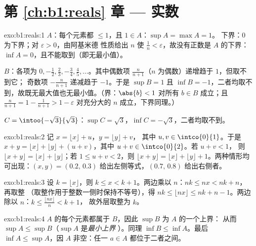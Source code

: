 \section*{第 \ref{ch:b1:reals} 章 --- 实数}

\begin{solution}{exo:b1:reals:1}
$A$：每个元素都 $\leq 1$，且 $1 \in A$：$\sup A = \max A = 1$。
下界：$0$ 为下界；对 $\varepsilon > 0$，由阿基米德
性质给出 $n$ 使 $\frac 1n < \varepsilon$，故没有正数是
$A$ 的下界：$\inf A = 0$，且不能取到（即无最小值）。

$B$：各项为 $0, -\frac12, \frac23, -\frac34, \frac45, \dots$。其中偶数项
$\frac{n}{n+1}$（$n$ 为偶数）递增趋于 $1$，但取不到它；
奇数项 $-\frac{n}{n+1}$ 递减趋于 $-1$。于是 $\sup B = 1$ 且
$\inf B = -1$，二者均取不到，故既无最大值也无最小值。（界：$\abs{b}
< 1$ 对所有 $b \in B$ 成立；且 $\frac{n}{n+1} = 1 - \frac{1}{n+1} > 1 -
\varepsilon$ 对充分大的 $n$ 成立，下界同理。）

$C = \intoo{-\sqrt 3}{\sqrt 3}$：$\sup C = \sqrt 3$，$\inf C =
-\sqrt 3$，二者均取不到。
\end{solution}

\begin{solution}{exo:b1:reals:2}
记 $x = \lfloor x \rfloor + u$，$y = \lfloor y \rfloor + v$，
其中 $u, v \in \intco{0}{1}$。于是 $x + y = \lfloor x \rfloor + \lfloor y
\rfloor + (u + v)$，其中 $u + v \in \intco{0}{2}$。若 $u + v < 1$，
则 $\lfloor x + y\rfloor = \lfloor x\rfloor + \lfloor y \rfloor$；若
$1 \leq u + v < 2$，则 $\lfloor x+y \rfloor = \lfloor x \rfloor +
\lfloor y \rfloor + 1$。两种情形均可出现：$(x, y) = (0.2,\, 0.3)$
给出左侧等式，$(0.7,\, 0.8)$ 给出右侧者。
\end{solution}

\begin{solution}{exo:b1:reals:3}
设 $k = \lfloor x \rfloor$，则 $k \leq x < k + 1$。两边乘以
$n$：$nk \leq nx < nk + n$，再取整
（取整作用于整数一侧时保持不等号），得 $nk \leq \lfloor nx \rfloor \leq nk + n
- 1$。两边除以 $n$：$k \leq \frac{\lfloor nx \rfloor}{n} < k + 1$，
故外层取整为 $k$。
\end{solution}

\begin{solution}{exo:b1:reals:4}
$A$ 的每个元素都属于 $B$，因此 $\sup B$ 为 $A$ 的一个上界：
从而 $\sup A \leq \sup B$（$\sup A$ 是\emph{最小上界}
）。同理 $\inf B \leq \inf A$。最后 $\inf A \leq
\sup A$，因 $A$ 非空：任一 $a \in A$ 都位于二者之间。
\end{solution}

